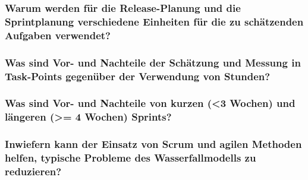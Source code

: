 \documentclass[main.tex]{subfiles}
\begin{document}
\subsubsection*{Warum werden für die Release-Planung und die Sprintplanung verschiedene Einheiten für die zu schätzenden Aufgaben verwendet?}
\subsubsection*{Was sind Vor- und Nachteile der Schätzung und Messung in Task-Points gegenüber der Verwendung von Stunden?}
\subsubsection*{Was sind Vor- und Nachteile von kurzen
(<3 Wochen) und
längeren (>= 4 Wochen) Sprints?}
\subsubsection*{Inwiefern kann der Einsatz von Scrum und
agilen Methoden helfen, typische Probleme
des Wasserfallmodells zu reduzieren?}
\end{document}
